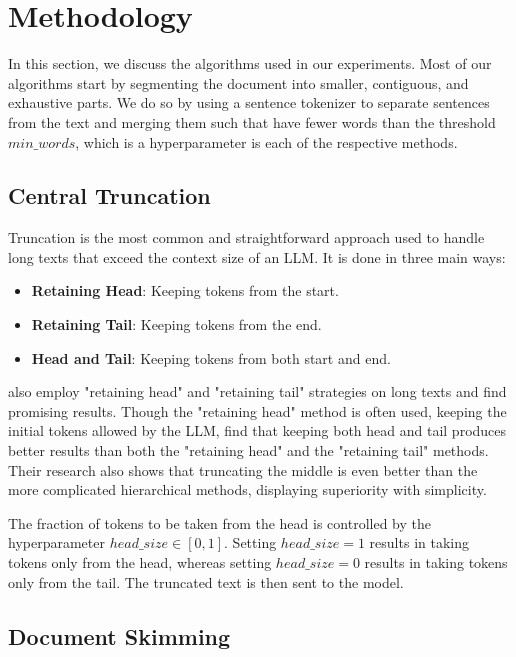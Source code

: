\section{Methodology}
	\label{sec:methodology}

	In this section, we discuss the algorithms used in our experiments.
	Most of our algorithms start by segmenting the document into smaller, contiguous, and exhaustive
	parts.
	We do so by using a sentence tokenizer to separate sentences from the text and merging them such that
	have fewer words than the threshold $min\_words$, which is a hyperparameter is each of the respective
	methods.


	\subsection{Central Truncation}
		\label{method:truncation}

		Truncation is the most common and straightforward approach used to handle long texts
		that exceed the context size of an LLM.
		It is done in three main ways:

		\begin{itemize}
			\item \textbf{Retaining Head}: Keeping tokens from the start.
			\item \textbf{Retaining Tail}: Keeping tokens from the end.
			\item \textbf{Head and Tail}: Keeping tokens from both start and end.
		\end{itemize}

		\citet{worsham-kalita-2018-genre} also employ "retaining head" and "retaining tail"
		strategies on long texts and find promising results.
		Though the "retaining head" method is often used, keeping the initial tokens allowed by
		the LLM, \citet{sun2019fine} find that keeping both head and tail produces better results
		than both the "retaining head" and the "retaining tail" methods.
		Their research also shows that truncating the middle is even better than the more
		complicated hierarchical methods, displaying superiority with simplicity.

		The fraction of tokens to be taken from the head is controlled by the hyperparameter $head\_size
		\in [0, 1]$.
		Setting $head\_size = 1$ results in taking tokens only from the head, whereas setting $head\_size
		= 0$ results in taking tokens only from the tail.
		The truncated text is then sent to the model.


	\subsection{Document Skimming}
		\label{method:skimming}

